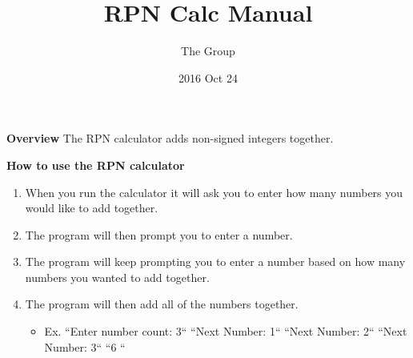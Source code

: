\documentclass[12pt]{article}
\title{RPN Calc Manual}
\author{The Group}
\date{2016 Oct 24}
\begin{document}
\setlength{\parindent}{0em}

\maketitle

\textbf{Overview} \newline
The RPN calculator adds non-signed integers together.
\vspace{5mm}

\textbf{How to use the RPN calculator}
\begin{enumerate}
	\item When you run the calculator it will ask you to enter how many numbers you would like to add together.
	\item The program will then prompt you to enter a number.
	\item The program will keep prompting you to enter a number based on how many numbers you wanted to add together.
	\item The program will then add all of the numbers together.
	\begin{itemize}
		\item Ex.\newline
		                ``Enter number count: 3`` \newline
			     ``Next Number: 1`` \newline
			     ``Next Number: 2``\newline
			     ``Next Number: 3`` \newline
			    ``6 `` \newline
	\end{itemize}
\end{enumerate}
\end{document}
